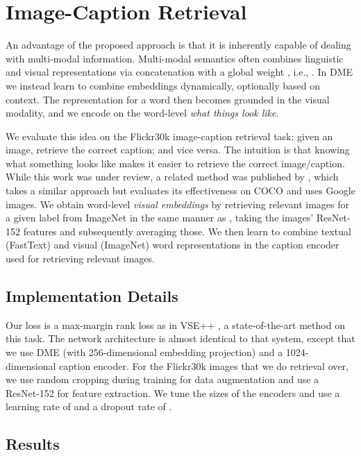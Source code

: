 \documentclass[11pt,a4paper]{article}
\begin{document}
\section{Image-Caption Retrieval}
\label{sec:imgcap}

An advantage of the proposed approach is that it is inherently capable of dealing with multi-modal information. Multi-modal semantics \cite{Bruni:2014jair} often combines linguistic and visual representations via concatenation with a global weight , i.e., . In DME we instead learn to combine embeddings dynamically, optionally based on context. The representation for a word then becomes grounded in the visual modality, and we encode on the word-level \emph{what things look like}.

We evaluate this idea on the Flickr30k image-caption retrieval task: given an image, retrieve the correct caption; and vice versa. The intuition is that knowing what something looks like makes it easier to retrieve the correct image/caption. While this work was under review, a related method was published by , which takes a similar approach but evaluates its effectiveness on COCO and uses Google images. We obtain word-level \emph{visual embeddings} by retrieving relevant images for a given label from ImageNet in the same manner as , taking the images' ResNet-152 features \cite{He:2016cvpr} and subsequently averaging those. We then learn to combine textual (FastText) and visual (ImageNet) word representations in the caption encoder used for retrieving relevant images.

\subsection{Implementation Details}

Our loss is a max-margin rank loss as in VSE++ \cite{Faghri:2017arxiv}, a state-of-the-art method on this task. The network architecture is almost identical to that system, except that we use DME (with 256-dimensional embedding projection) and a 1024-dimensional caption encoder. For the Flickr30k images that we do retrieval over, we use random cropping during training for data augmentation and use a ResNet-152 for feature extraction. We tune the sizes of the encoders and use a learning rate of  and a dropout rate of .

\subsection{Results}
\end{document}
